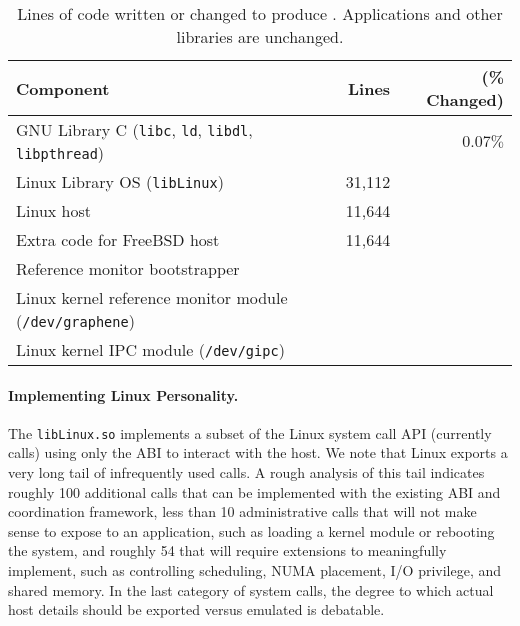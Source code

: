 \begin{table}[t!b!]
\footnotesize
\centering
\begin{tabular}{|l|rr|}
\hline
{\bf Component} & {\bf Lines} & ({\bf \% Changed})\\
\hline
GNU Library C ({\tt libc}, {\tt ld}, {\tt libdl}, {\tt libpthread}) & \libclines{} & $0.07\%$ \\
\hline
Linux Library OS ({\tt libLinux}) & 31,112 & \\
Linux host \pal{} & 11,644 & \\
Extra code for FreeBSD host \pal{} & 11,644 & \\
\hline
Reference monitor bootstrapper & {} & \\
Linux kernel reference monitor module ({\tt /dev/graphene}) & \sandboxmodlines{} & \\
Linux kernel IPC module ({\tt /dev/gipc}) & \gipclines{} & \\
\hline
\end{tabular}
\caption[Lines of code written or changed in \sysname{}]
{Lines of code written or changed to produce \sysname{}.  Applications and other libraries are unchanged.}
\label{tab:graphene:loc}
\end{table}





\paragraph{Implementing Linux Personality.} 
The \sysname{} {\tt libLinux.so} implements a subset 
of the Linux system call API (currently \syscalls{} calls)
using only the \pal{} ABI to interact with the host.
We note that Linux exports a very long tail of infrequently used calls.
A rough analysis of this tail indicates roughly 100 additional calls that can be implemented
with the existing \pal{} ABI and coordination framework, less than 10 administrative calls that will not make sense to expose to 
an application, such as loading a kernel module or rebooting the system, and roughly 54 that will require 
\pal{} extensions to meaningfully implement, such as controlling scheduling,
NUMA placement, I/O privilege, and shared memory.
In the last category of system calls, the degree to which actual host details should be exported versus emulated is debatable.

